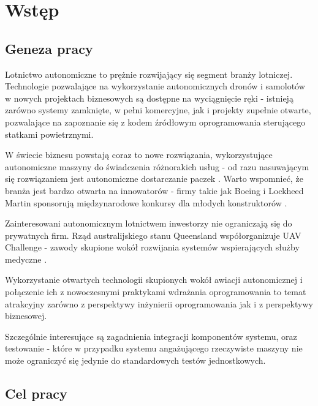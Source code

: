 \chapter{Wstęp}



\section{Geneza pracy}

Lotnictwo autonomiczne to prężnie rozwijający się segment branży lotniczej.
Technologie pozwalające na wykorzystanie autonomicznych dronów i samolotów
w nowych projektach biznesowych są dostępne na wyciągnięcie ręki - istnieją
zarówno systemy zamknięte, w pełni komercyjne, jak i projekty zupełnie otwarte,
pozwalające na zapoznanie się z kodem źródłowym oprogramowania sterującego statkami
powietrznymi. 

W świecie biznesu powstają coraz to nowe rozwiązania, wykorzystujące autonomiczne
maszyny do świadczenia różnorakich usług - od razu nasuwającym się rozwiązaniem
jest autonomiczne dostarczanie paczek \cite{prime_air}. Warto wspomnieć, że branża
jest bardzo otwarta na innowatorów - firmy takie jak Boeing i Lockheed Martin
sponsorują międzynarodowe konkursy dla młodych konstruktorów \cite{sae_2018}. 

Zainteresowani autonomicznym lotnictwem inwestorzy nie ograniczają się do
prywatnych firm. Rząd australijskiego stanu Queensland współorganizuje
UAV Challenge - zawody skupione wokół rozwijania systemów wspierających 
służby medyczne \cite{uav_sponsors}.


Wykorzystanie otwartych technologii skupionych wokół awiacji autonomicznej
i połączenie ich z nowoczesnymi praktykami wdrażania oprogramowania to temat
atrakcyjny zarówno z perspektywy inżynierii oprogramowania jak i z perspektywy biznesowej. 

Szczególnie interesujące są zagadnienia integracji komponentów systemu,
oraz testowanie - które w przypadku systemu angażującego rzeczywiste
maszyny nie może ograniczyć się jedynie do standardowych testów jednostkowych.


\section{Cel pracy}

